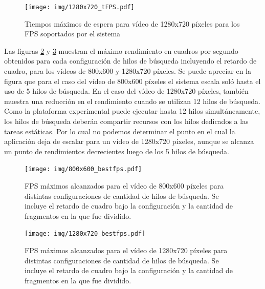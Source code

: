 \begin{figure}[h]

	\texttt{[image: img/1280x720\_tFPS.pdf]}
	\caption{Tiempos máximos de espera para vídeo de 1280x720 píxeles para
	los FPS soportados por el sistema}
	\label{1280tFPS}

\end{figure}

Las figuras \ref{bestFPS800} y \ref{bestFPS1280} muestran el máximo rendimiento
en cuadros por segundo obtenidos para cada configuración de hilos de búsqueda
incluyendo el retardo de cuadro, para los vídeos de 800x600 y 1280x720 píxeles.
Se puede apreciar en la figura que para el caso del vídeo de 800x600 píxeles el
sistema escala soló hasta el uso de 5 hilos de búsqueda. En el caso del vídeo de
1280x720 píxeles, también muestra una reducción en el rendimiento cuando se
utilizan 12 hilos de búsqueda. Como la plataforma experimental puede ejecutar
hasta 12 hilos simultáneamente, los hilos de búsqueda deberán compartir recursos
con los hilos dedicados a las tareas estáticas. Por lo cual no podemos
determinar el punto en el cual la aplicación deja de escalar para un vídeo de
1280x720 píxeles, aunque se alcanza un punto de rendimientos decrecientes luego
de los 5 hilos de búsqueda.

\begin{figure}[h]

	\texttt{[image: img/800x600\_bestfps.pdf]}
	\caption{FPS máximos alcanzados para el vídeo de 800x600 píxeles para
	distintas configuraciones de cantidad de hilos de búsqueda. Se incluye
	el retardo de cuadro bajo la configuración y la cantidad de fragmentos
	en la que fue dividido.} \label{bestFPS800}

\end{figure}

\begin{figure}[h]

	\texttt{[image: img/1280x720\_bestfps.pdf]}
	\caption{FPS máximos alcanzados para el vídeo de 1280x720 píxeles para
	distintas configuraciones de cantidad de hilos de búsqueda. Se incluye
	el retardo de cuadro bajo la configuración y la cantidad de fragmentos
	en la que fue dividido.}
	\label{bestFPS1280}

\end{figure}

